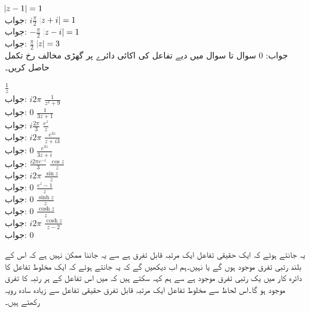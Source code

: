 \quad
$\abs{z-1}=1$\\
جواب:\quad
$i\tfrac{\pi}{2}$
\quad
$\abs{z+i}=1$\\
جواب:\quad
$-\tfrac{\pi}{2}$
\quad
$\abs{z-i}=1$\\
جواب:\quad
$\tfrac{\pi}{2}$
\quad
$\abs{z}=3$\\
جواب:\quad
$0$
سوال  تا سوال  میں دیے تفاعل کی اکائی دائرے پر گھڑی مخالف رخ تکمل حاصل کریں۔

\quad
$\tfrac{1}{z}$\\
جواب:\quad
$i2\pi$
\quad
$\tfrac{1}{z^2+9}$\\
جواب:\quad
$0$
\quad
$\tfrac{1}{3z+1}$\\
جواب:\quad
$i\tfrac{2\pi}{3}$
\quad
$\tfrac{e^z}{z}$\\
جواب:\quad
$i2\pi$
\quad
$\tfrac{e^{3z}}{z+i3}$\\
جواب:\quad
$0$
\quad
$\tfrac{e^{3z}}{3z+i}$\\
جواب:\quad
$\tfrac{i2\pi e^{-i}}{3}$
\quad
$\tfrac{\cos z}{z}$\\
جواب:\quad
$i2\pi$
\quad
$\tfrac{\sin z}{z}$\\
جواب:\quad
$0$
\quad
$\tfrac{e^z-1}{z}$\\
جواب:\quad
$0$
\quad
$\tfrac{\sinh z}{z}$\\
جواب:\quad
$0$
\quad
$\tfrac{\cosh z}{z}$\\
جواب:\quad
$i2\pi$
\quad
$\tfrac{\cosh z}{z-2}$\\
جواب:\quad
$0$

یہ جانتے ہوئے کہ ایک حقیقی تفاعل ایک مرتبہ قابل تفرق ہے سے یہ جاننا ممکن نہیں ہے کہ  اس کے بلند رتبی تفرق موجود ہوں گے یا نہیں۔ہم اب دیکھیں گے کہ یہ جانتے ہوئے کہ ایک مخلوط تفاعل کا دائرہ کار  میں  یک رتبی تفرق موجود ہے سے ہم کہہ سکتے ہیں کہ  میں اس تفاعل کے ہر رتبہ کا تفرق موجود ہو گا۔اس لحاظ سے مخلوط تفاعل ایک مرتبہ قابل تفرق حقیقی تفاعل سے زیادہ سادہ رویہ رکھتے ہیں۔

